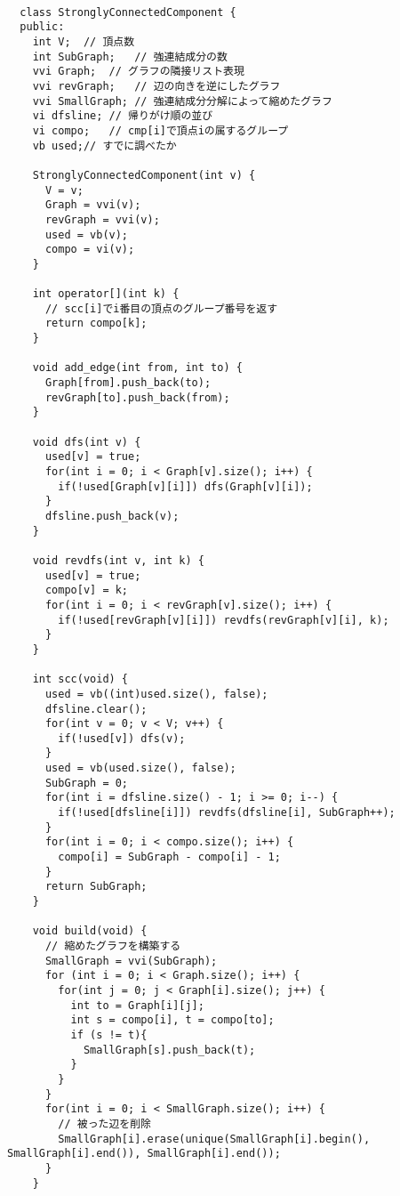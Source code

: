 \documentclass{jsarticle}
\begin{document}
\begin{lstlisting}[caption=StronglyConnectedComponent]

  class StronglyConnectedComponent {
  public:
    int V;  // 頂点数
    int SubGraph;   // 強連結成分の数
    vvi Graph;  // グラフの隣接リスト表現
    vvi revGraph;   // 辺の向きを逆にしたグラフ
    vvi SmallGraph; // 強連結成分分解によって縮めたグラフ
    vi dfsline; // 帰りがけ順の並び
    vi compo;   // cmp[i]で頂点iの属するグループ
    vb used;// すでに調べたか
  
    StronglyConnectedComponent(int v) {
      V = v;
      Graph = vvi(v);
      revGraph = vvi(v);
      used = vb(v);
      compo = vi(v);
    }
  
    int operator[](int k) {
      // scc[i]でi番目の頂点のグループ番号を返す
      return compo[k];
    }
  
    void add_edge(int from, int to) {
      Graph[from].push_back(to);
      revGraph[to].push_back(from);
    }
  
    void dfs(int v) {
      used[v] = true;
      for(int i = 0; i < Graph[v].size(); i++) {
        if(!used[Graph[v][i]]) dfs(Graph[v][i]);
      }
      dfsline.push_back(v);
    }
  
    void revdfs(int v, int k) {
      used[v] = true;
      compo[v] = k;
      for(int i = 0; i < revGraph[v].size(); i++) {
        if(!used[revGraph[v][i]]) revdfs(revGraph[v][i], k);
      }
    }
  
    int scc(void) {
      used = vb((int)used.size(), false);
      dfsline.clear();
      for(int v = 0; v < V; v++) {
        if(!used[v]) dfs(v);
      }
      used = vb(used.size(), false);
      SubGraph = 0;
      for(int i = dfsline.size() - 1; i >= 0; i--) {
        if(!used[dfsline[i]]) revdfs(dfsline[i], SubGraph++);
      }
      for(int i = 0; i < compo.size(); i++) {
        compo[i] = SubGraph - compo[i] - 1;
      }
      return SubGraph;
    }
  
    void build(void) {
      // 縮めたグラフを構築する
      SmallGraph = vvi(SubGraph);
      for (int i = 0; i < Graph.size(); i++) {
        for(int j = 0; j < Graph[i].size(); j++) {
          int to = Graph[i][j];
          int s = compo[i], t = compo[to];
          if (s != t){
            SmallGraph[s].push_back(t);
          }
        }
      }
      for(int i = 0; i < SmallGraph.size(); i++) {
        // 被った辺を削除
        SmallGraph[i].erase(unique(SmallGraph[i].begin(), SmallGraph[i].end()), SmallGraph[i].end());
      }
    }
  

\end{lstlisting}
\end{document}
